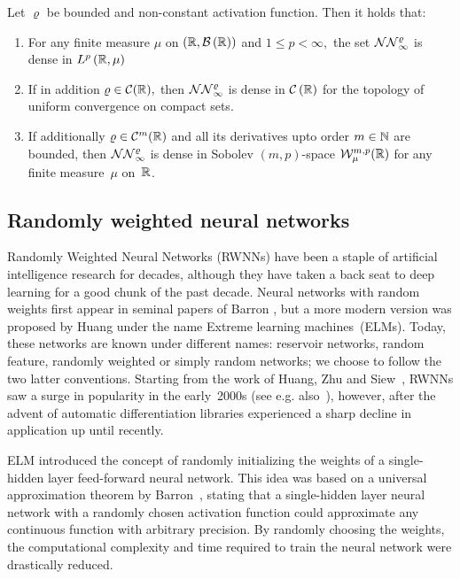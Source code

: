 \begin{theorem}\label{thm:UAT}
Let $\varrho$ be bounded and
non-constant activation function. Then it holds that:
\begin{enumerate}
\item For any finite measure $\mu$ on $\left(\mathbb{R}, \mathcal{B}\left(\mathbb{R}\right)\right)$ and $1 \leq p<\infty,$ the set
$\mathcal{NN}_{\infty}^{\varrho}$ is dense in $L^{p}\left(\mathbb{R}, \mu\right)$
\item If in addition $\varrho \in \mathcal{C}(\mathbb{R}),$ then $\mathcal{NN}_{\infty}^{\varrho}$ is dense in $\mathcal{C}\left(\mathbb{R}\right)$ for the
topology of uniform convergence on compact sets.
\item If additionally $\varrho\in \mathcal{C}^m(\mathbb{R})$ and all its derivatives upto order $m\in\mathbb{N}$ are bounded, then $\mathcal{NN}_{\infty}^{\varrho}$ is dense in Sobolev $(m,p)$-space $\mathcal{W}^{m,p}_{\mu}(\mathbb{R})$ for any finite measure~$\mu$ on~$\mathbb{R}$.
\end{enumerate}
\end{theorem}

\subsection{Randomly weighted neural networks}\label{sec:RWNN}
Randomly Weighted Neural Networks (RWNNs) have been a staple of artificial intelligence research for decades, although they have taken a back seat to deep learning for a good chunk of the past decade. Neural networks with random weights first appear in seminal papers of Barron \cite{Barron1992NeuralSystems, Barron1993UniversalFunction}, but a more modern version was proposed by Huang \cite{Huang2006UniversalNodes} under the name Extreme learning machines~(ELMs). Today, these networks are known under different names: reservoir networks, random feature, randomly weighted or simply random networks; we choose to follow the two latter conventions. Starting from the work of Huang, Zhu and Siew~\cite{Huang2006UniversalNodes}, RWNNs saw a surge in popularity in the early~2000s (see e.g. also~\cite{Rahimi2007RandomMachines, Rahimi2008WeightedLearning}), however, after the advent of automatic differentiation libraries experienced a sharp decline in application up until recently.

ELM introduced the concept of randomly initializing the weights of a single-hidden layer feed-forward neural network. This idea was based on a universal approximation theorem by Barron~\cite{Barron1993UniversalFunction}, stating that a single-hidden layer neural network with a randomly chosen activation function could approximate any continuous function with arbitrary precision. By randomly choosing the weights, the computational complexity and time required to train the neural network were drastically reduced.

